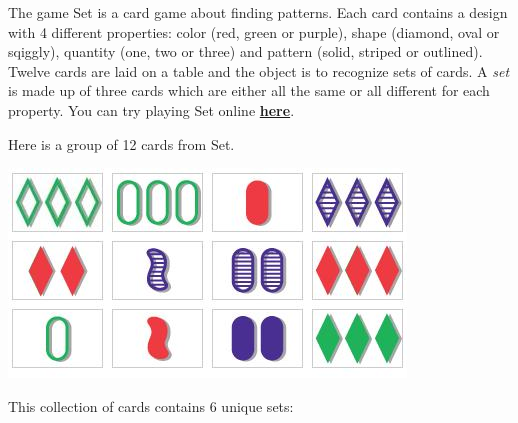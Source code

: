 \begin{problem}
The game Set is a card game about finding patterns. Each card contains a design with 4 different properties: color (red, green or purple), shape (diamond, oval or sqiggly), quantity (one, two or three) and pattern (solid, striped or outlined). Twelve cards are laid on a table and the object is to recognize sets of cards. A \emph{set} is made up of three cards which are either all the same or all different for each property. You can try playing Set online \href{http://smart-games.org/en/set/start}{\textbf{here}}.

Here is a group of 12 cards from Set.

\vspace{5mm}

\includegraphics{figures/set_game.jpg}

\vspace{5mm}

This collection of cards contains 6 unique sets:
\vspace{5mm}


\end{problem}
